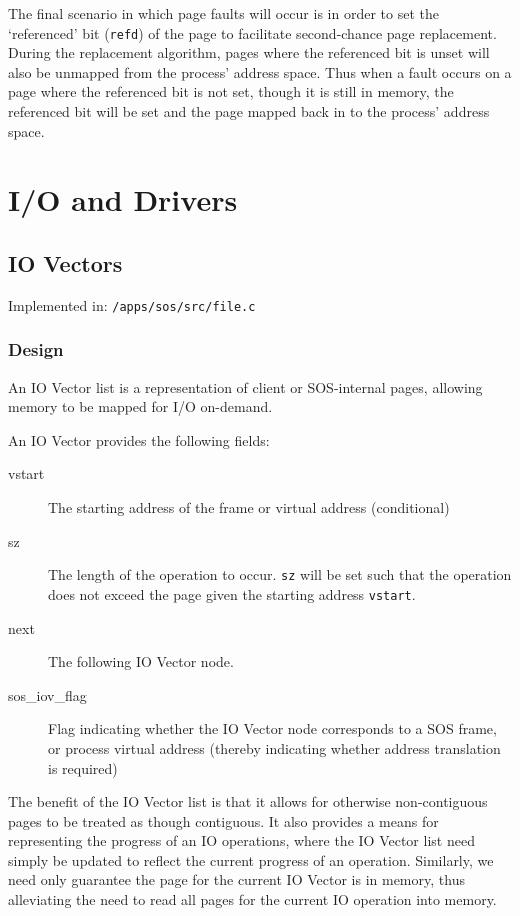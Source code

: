 \documentclass[a4paper,12pt]{article}
\begin{document}
The final scenario in which page faults will occur is in order to set the
`referenced' bit (\texttt{refd}) of the page to facilitate second-chance page
replacement.  During the replacement algorithm, pages where the referenced bit
is unset will also be unmapped from the process' address space.  Thus when a
fault occurs on a page where the referenced bit is not set, though it is still
in memory, the referenced bit will be set and the page mapped back in to the
process' address space.

\section{I/O and Drivers}
\subsection{IO Vectors}
Implemented in: \texttt{/apps/sos/src/file.c}

\subsubsection{Design}
An IO Vector list is a representation of client or SOS-internal pages,
allowing memory to be mapped for I/O on-demand.

An IO Vector provides the following fields:
\begin{description}
\item[vstart] The starting address of the frame or virtual address (conditional)
\item[sz] The length of the operation to occur.  \texttt{sz} will be set such that the
  operation does not exceed the page given the starting address \texttt{vstart}.
\item[next] The following IO Vector node.
\item[sos\_iov\_flag] Flag indicating whether the IO Vector node corresponds to
  a SOS frame, or process virtual address (thereby indicating whether
  address translation is required)
\end{description}

The benefit of the IO Vector list is that it allows for otherwise
non-contiguous pages to be treated as though contiguous.  It also provides a
means for representing the progress of an IO operations, where the IO Vector
list need simply be updated to reflect the current progress of an operation.
Similarly, we need only guarantee the page for the current IO Vector is in
memory, thus alleviating the need to read all pages for the current IO
operation into memory.
\end{document}
